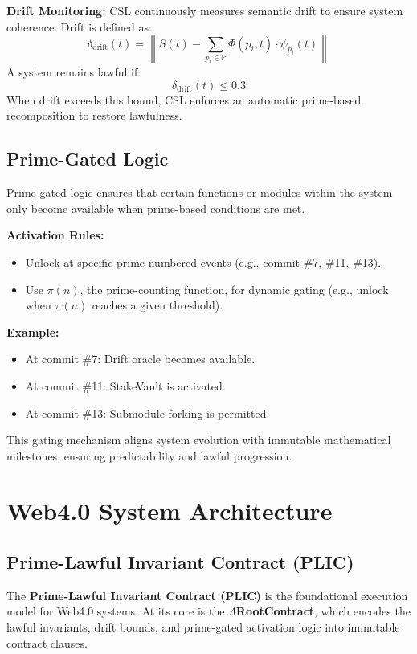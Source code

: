 \documentclass[12]{amsart}
\theoremstyle{plain}
\begin{document}
\textbf{Drift Monitoring:} CSL continuously measures semantic drift to ensure system coherence. Drift is defined as:
\begin{equation}
\delta_{\text{drift}}(t) = \left\| S(t) - \sum_{p_i \in \mathbb{P}} \Phi(p_i, t) \cdot \psi_{p_i}(t) \right\|
\end{equation}
A system remains lawful if:
\begin{equation}
\delta_{\text{drift}}(t) \leq 0.3
\end{equation}
When drift exceeds this bound, CSL enforces an automatic prime-based recomposition to restore lawfulness.

\subsection{Prime-Gated Logic}
Prime-gated logic ensures that certain functions or modules within the system only become available when prime-based conditions are met.

\textbf{Activation Rules:}
\begin{itemize}
    \item Unlock at specific prime-numbered events (e.g., commit \#7, \#11, \#13).
    \item Use $\pi(n)$, the prime-counting function, for dynamic gating (e.g., unlock when $\pi(n)$ reaches a given threshold).
\end{itemize}

\textbf{Example:}  
\begin{itemize}
    \item At commit \#7: Drift oracle becomes available.
    \item At commit \#11: StakeVault is activated.
    \item At commit \#13: Submodule forking is permitted.
\end{itemize}

This gating mechanism aligns system evolution with immutable mathematical milestones, ensuring predictability and lawful progression.

\section{Web4.0 System Architecture}

\subsection{Prime-Lawful Invariant Contract (PLIC)}
The \textbf{Prime-Lawful Invariant Contract (PLIC)} is the foundational execution model for Web4.0 systems. At its core is the \textbf{$\Lambda$RootContract}, which encodes the lawful invariants, drift bounds, and prime-gated activation logic into immutable contract clauses.
\end{document}
